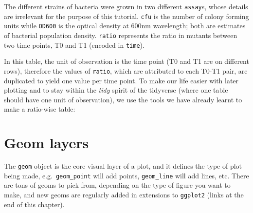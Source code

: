 \documentclass[]{book}
\newenvironment{Shaded}{}{}
\newcommand{\CommentTok}[1]{\textcolor[rgb]{0.38,0.63,0.69}{\textit{#1}}}
\newcommand{\DataTypeTok}[1]{\textcolor[rgb]{0.56,0.13,0.00}{#1}}
\newcommand{\KeywordTok}[1]{\textcolor[rgb]{0.00,0.44,0.13}{\textbf{#1}}}
\newcommand{\NormalTok}[1]{#1}
\newcommand{\OperatorTok}[1]{\textcolor[rgb]{0.40,0.40,0.40}{#1}}
\newcommand{\StringTok}[1]{\textcolor[rgb]{0.25,0.44,0.63}{#1}}
\begin{document}
The different strains of bacteria were grown in two different \texttt{assay}s, whose details are irrelevant for the purpose of this tutorial. \texttt{cfu} is the number of colony forming units while \texttt{OD600} is the optical density at 600nm wavelength; both are estimates of bacterial population density. \texttt{ratio} represents the ratio in mutants between two time points, T0 and T1 (encoded in \texttt{time}).

In this table, the unit of observation is the time point (T0 and T1 are on different rows), therefore the values of \texttt{ratio}, which are attributed to each T0-T1 pair, are duplicated to yield one value per time point. To make our life easier with later plotting and to stay within the \emph{tidy} spirit of the tidyverse (where one table should have one unit of observation), we use the tools we have already learnt to make a ratio-wise table:

\begin{Shaded}
\end{Shaded}

\hypertarget{geom-layers}{%
\section{Geom layers}\label{geom-layers}}

The \texttt{geom} object is the core visual layer of a plot, and it defines the type of plot being made, e.g.~\texttt{geom\_point} will add points, \texttt{geom\_line} will add lines, etc. There are tons of geoms to pick from, depending on the type of figure you want to make, and new geoms are regularly added in extensions to \texttt{ggplot2} (links at the end of this chapter).
\end{document}

